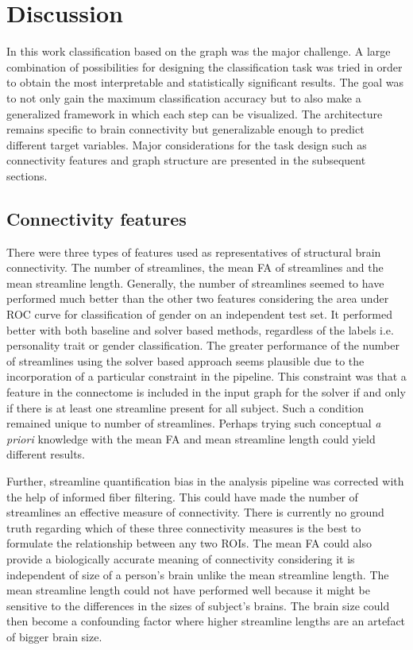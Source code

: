 \documentclass[msthesis.tex]{subfiles}
\begin{document}
\chapter{Discussion}
In this work classification based on the graph was the major challenge. A large combination of possibilities for designing the classification task was tried in order to obtain the most interpretable and
statistically significant results. The goal was to not only gain the maximum classification accuracy but to also make a generalized framework in which each step can be visualized. The architecture remains specific
to brain connectivity but generalizable enough to predict different target variables. Major considerations for the task design such as connectivity features and graph structure are presented in the subsequent sections.

\section{Connectivity features}
There were three types of features used as representatives of structural brain connectivity. The number of streamlines, the mean FA of streamlines and the mean streamline length. Generally, the number of streamlines seemed to have performed much better than the other two features considering the area under ROC curve for classification of gender on an independent test set. It performed better with both baseline and solver based methods, regardless of the labels i.e. personality trait or gender classification. The greater performance of the number of streamlines using the solver based approach seems plausible due to the incorporation of a particular constraint in the pipeline. This constraint was that a feature in the connectome is included in the input graph for the solver if and only if there is at least one streamline present for all subject. Such a condition remained unique to number of streamlines. Perhaps trying such conceptual \textit{a priori} knowledge with the mean FA and mean streamline length could yield different results. 

Further, streamline quantification bias in the analysis pipeline was corrected with the help of informed fiber filtering. This could have made the number of streamlines an effective measure of connectivity. There is currently no ground truth regarding which of these three connectivity measures is the best to formulate the relationship between any two ROIs. The mean FA could also provide a biologically accurate meaning of connectivity considering it is independent of size of a person's brain unlike the mean streamline length. The mean streamline length could not have performed well because it might be sensitive to the differences in the sizes of subject's brains. The brain size could then become a confounding factor where higher streamline lengths are an artefact of bigger brain size.
\end{document}
